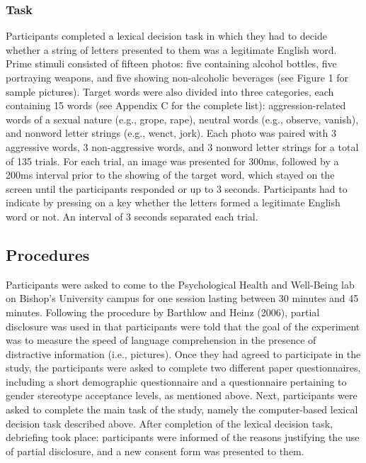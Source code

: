 \documentclass[authordate, serif, review]{jote-article}
\begin{document}
\begin{multicols}{2}
\subsubsection*{Task} Participants completed a lexical decision task in which they had to decide whether a string of letters presented to them was a legitimate English word. Prime stimuli consisted of fifteen photos: five containing alcohol bottles, five portraying weapons, and five showing non-alcoholic beverages (see Figure 1 for sample pictures). Target words were also divided into three categories, each containing 15 words (see Appendix C for the complete list): aggression-related words of a sexual nature (e.g., grope, rape), neutral words (e.g., observe, vanish), and nonword letter strings (e.g., wenct, jork). Each photo was paired with 3 aggressive words, 3 non-aggressive words, and 3 nonword letter strings for a total of 135 trials. For each trial, an image was presented for 300ms, followed by a 200ms interval prior to the showing of the target word, which stayed on the screen until the participants responded or up to 3 seconds. Participants had to indicate by pressing on a key whether the letters formed a legitimate English word or not. An interval of 3 seconds separated each trial.

{}
\subsection*{Procedures}

Participants were asked to come to the Psychological Health and Well-Being lab on Bishop's University campus for one session lasting between 30 minutes and 45 minutes. Following the procedure by Barthlow and Heinz (2006), partial disclosure was used in that participants were told that the goal of the experiment was to measure the speed of language comprehension in the presence of distractive information (i.e., pictures). Once they had agreed to participate in the study, the participants were asked to complete two different paper questionnaires, including a short demographic questionnaire and a questionnaire pertaining to gender stereotype acceptance levels, as mentioned above. Next, participants were asked to complete the main task of the study, namely the computer-based lexical decision task described above. After completion of the lexical decision task, debriefing took place: participants were informed of the reasons justifying the use of partial disclosure, and a new consent form was presented to them.  



\end{multicols}
\end{document}
